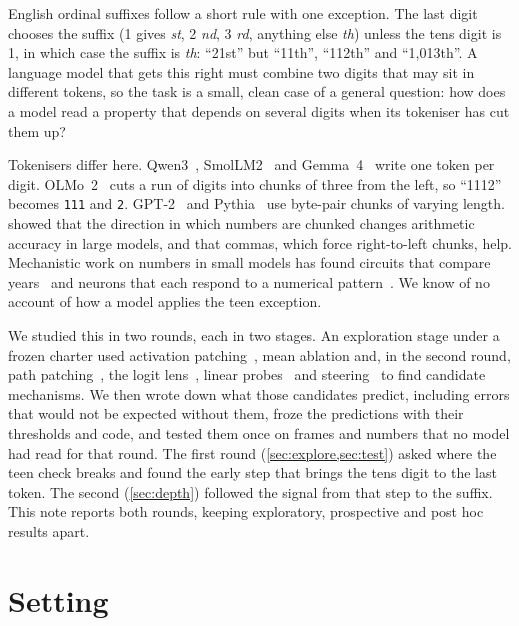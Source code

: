 \documentclass[11pt]{article}
\newcommand{\sfx}[1]{\textit{#1}}
\begin{document}
English ordinal suffixes follow a short rule with one exception. The last digit chooses the suffix (1 gives \sfx{st}, 2 \sfx{nd}, 3 \sfx{rd}, anything else \sfx{th}) unless the tens digit is 1, in which case the suffix is \sfx{th}: ``21st'' but ``11th'', ``112th'' and ``1{,}013th''. A language model that gets this right must combine two digits that may sit in different tokens, so the task is a small, clean case of a general question: how does a model read a property that depends on several digits when its tokeniser has cut them up?

Tokenisers differ here. Qwen3~\citep{qwen2025qwen3}, SmolLM2~\citep{benallal2025smollm2} and Gemma~4~\citep{gemma2026gemma4} write one token per digit. OLMo~2~\citep{olmo2024olmo2} cuts a run of digits into chunks of three from the left, so ``1112'' becomes \texttt{111} and \texttt{2}. GPT-2~\citep{radford2019language} and Pythia~\citep{biderman2023pythia} use byte-pair chunks of varying length. \citet{singh2024tokenization} showed that the direction in which numbers are chunked changes arithmetic accuracy in large models, and that commas, which force right-to-left chunks, help. Mechanistic work on numbers in small models has found circuits that compare years~\citep{hanna2023greaterthan} and neurons that each respond to a numerical pattern~\citep{nikankin2025heuristics}. We know of no account of how a model applies the teen exception.

We studied this in two rounds, each in two stages. An exploration stage under a frozen charter used activation patching~\citep{meng2022locating,heimersheim2024patching,zhang2024patching}, mean ablation and, in the second round, path patching~\citep{wang2023ioi,goldowskydill2023path}, the logit lens~\citep{belrose2023tuned}, linear probes~\citep{alain2016probes} and steering~\citep{turner2023steering} to find candidate mechanisms. We then wrote down what those candidates predict, including errors that would not be expected without them, froze the predictions with their thresholds and code, and tested them once on frames and numbers that no model had read for that round. The first round (\cref{sec:explore,sec:test}) asked where the teen check breaks and found the early step that brings the tens digit to the last token. The second (\cref{sec:depth}) followed the signal from that step to the suffix. This note reports both rounds, keeping exploratory, prospective and post hoc results apart.

\section{Setting}
\label{sec:setting}
\end{document}

